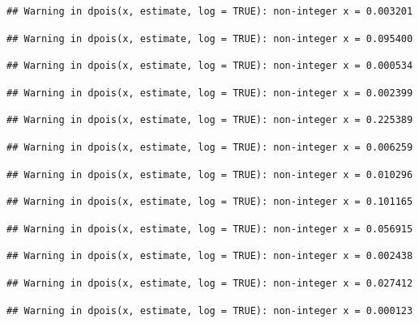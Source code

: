 \documentclass[]{article}
\begin{document}
\begin{verbatim}
## Warning in dpois(x, estimate, log = TRUE): non-integer x = 0.003201
\end{verbatim}

\begin{verbatim}
## Warning in dpois(x, estimate, log = TRUE): non-integer x = 0.095400
\end{verbatim}

\begin{verbatim}
## Warning in dpois(x, estimate, log = TRUE): non-integer x = 0.000534
\end{verbatim}

\begin{verbatim}
## Warning in dpois(x, estimate, log = TRUE): non-integer x = 0.002399
\end{verbatim}

\begin{verbatim}
## Warning in dpois(x, estimate, log = TRUE): non-integer x = 0.225389
\end{verbatim}

\begin{verbatim}
## Warning in dpois(x, estimate, log = TRUE): non-integer x = 0.006259
\end{verbatim}

\begin{verbatim}
## Warning in dpois(x, estimate, log = TRUE): non-integer x = 0.010296
\end{verbatim}

\begin{verbatim}
## Warning in dpois(x, estimate, log = TRUE): non-integer x = 0.101165
\end{verbatim}

\begin{verbatim}
## Warning in dpois(x, estimate, log = TRUE): non-integer x = 0.056915
\end{verbatim}

\begin{verbatim}
## Warning in dpois(x, estimate, log = TRUE): non-integer x = 0.002438
\end{verbatim}

\begin{verbatim}
## Warning in dpois(x, estimate, log = TRUE): non-integer x = 0.027412
\end{verbatim}

\begin{verbatim}
## Warning in dpois(x, estimate, log = TRUE): non-integer x = 0.000123
\end{verbatim}
\end{document}
